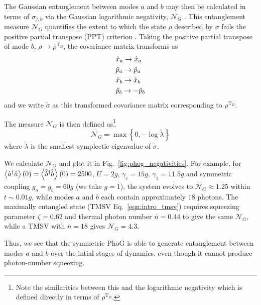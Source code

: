 The Gaussian entanglement between modes $a$ and $b$ may then be calculated in terms of $\sigma_{j, k}$ via the Gaussian logarithmic negativity, $\mathcal{N}_G$ \cite{Adesso2007a, Simon2000}. This entanglement measure $\mathcal{N}_G$ quantifies the extent to which the state $\rho$ described by $\sigma$ fails the positive partial transpose (PPT) criterion \cite{Simon2000, Plenio2005}. Taking the positive partial transpose of mode $b$, $\rho \rightarrow \rho^{\text{T}_B}$, the covariance matrix transforms as \cite{Simon2000}
\begin{align}
&\hat{x}_a \rightarrow \hat{x}_a \notag \\
%
&\hat{p}_a \rightarrow \hat{p}_a \notag \\
%
&\hat{x}_b \rightarrow \hat{x}_b \notag \\
%
&\hat{p}_b \rightarrow - \hat{p}_b \notag
\end{align}
and we write $\tilde{\sigma}$ as this transformed covariance matrix corresponding to $\rho^{\text{T}_B}$.

\noindent The measure $\mathcal{N}_G$ is then defined as\footnote{Note the similarities between this and the logarithmic negativity \cite{Plenio2005} which is defined directly in terms of $\rho^{\text{T}_B}$.}
\begin{equation}
\mathcal{N}_G = \max\left\{0, - \log \tilde{\lambda} \right\}
\end{equation}
where $\tilde{\lambda}$ is the smallest symplectic eigenvalue of $\tilde{\sigma}$. %

We calculate $\mathcal{N}_G$ and plot it in Fig.~\ref{fig:phog_negativities}. For example, for $\ev{\hat{a}^\dagger \hat{a}}\left(0\right) = \ev{\hat{b}^\dagger \hat{b}}\left(0\right) = 2500$, $U = 2 g$, $\gamma_c = 15 g$, $\gamma_1 = 11.5 g$ and symmetric coupling $g_a = g_b = 60 g$ (we take $g=1$), the system evolves to $\mathcal{N}_G \approx 1.25$ within $t \sim 0.01 g$, while modes $a$ and $b$ each contain approximately $18$ photons. The maximally entangled state (TMSV Eq.~\ref{eqn:intro_tmsv}) requires squeezing parameter $\zeta = 0.62$ and thermal photon number $\bar{n} = 0.44$ to give the same $\mathcal{N}_G$, while a TMSV with $\bar{n}=18$ gives $\mathcal{N}_G = 4.3$.

 Thus, we see that the symmetric PhoG is able to generate entanglement between modes $a$ and $b$ over the intial stages of dynamics, even though it cannot produce photon-number squeezing. %


